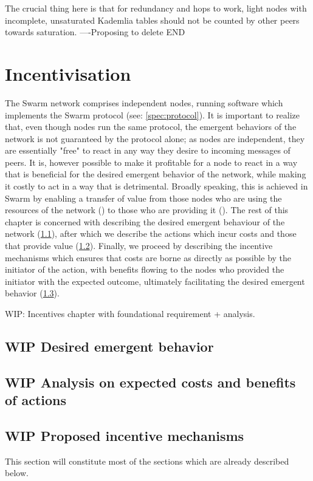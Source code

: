 The crucial thing here is that for redundancy and hops to work, light nodes with   incomplete, unsaturated Kademlia tables should not be counted by other peers towards saturation.
----Proposing to delete END
\chapter{Incentivisation}\label{sec:incentivisation}
The Swarm network comprises independent nodes, running software which implements the Swarm protocol (see: \ref{spec:protocol}). It is important to realize that, even though nodes run the same protocol, the emergent behaviors of the network is not guaranteed by the protocol alone; as nodes are independent, they are essentially "free" to react in any way they desire to incoming messages of peers.
It is, however possible to make it profitable for a node to react in a way that is beneficial for the desired emergent behavior of the network, while making it costly to act in a way that is detrimental. Broadly speaking, this is achieved in Swarm by enabling a transfer of value from those nodes who are using the resources of the network () to those who are providing it (). 
The rest of this chapter is concerned with describing the desired emergent behaviour of the network (\ref{sec:emergent_behavior}), after which we describe the actions which incur costs and those that provide value (\ref{sec:cost_benefit}). Finally, we proceed by describing the incentive mechanisms which ensures that costs are borne as directly as possible by the initiator of the action, with benefits flowing to the nodes who provided the initiator with the expected outcome, ultimately facilitating the desired emergent behavior (\ref{sec:incentive_mechanisms}).

WIP: Incentives chapter with foundational requirement + analysis. 
\section{WIP Desired emergent behavior}\label{sec:emergent_behavior}
\section{WIP Analysis on expected costs and benefits of actions}\label{sec:cost_benefit}
\section{WIP Proposed incentive mechanisms}\label{sec:incentive_mechanisms}
This section will constitute most of the sections which are already described below.

